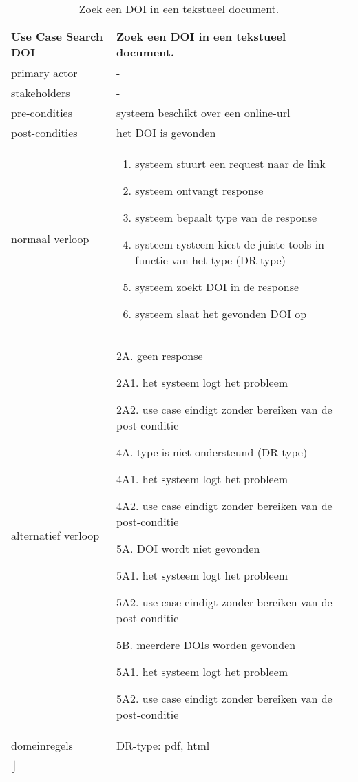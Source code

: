 \begin{table}[ptb]
    \centering
    \begin{tabular}{ | m{5cm} | m{10cm}| } 
        \hline
        \rowcolor{lightgray}
        Use Case Search DOI & Zoek een DOI in een tekstueel document. \\ 
        \hline
        primary actor & - \\ 
        \hline
        stakeholders & - \\ 
        \hline
        pre-condities & systeem beschikt over een online-url \\ 
        \hline
        post-condities & het DOI is gevonden \\ 
        \hline
        normaal verloop & 
        \begin{enumerate}
            \item systeem stuurt een request naar de link
            \item systeem ontvangt response
            \item systeem bepaalt type van de response
            \item systeem systeem kiest de juiste tools in functie van het type (DR-type)
            \item systeem zoekt DOI in de response
            \item systeem slaat het gevonden DOI op
        \end{enumerate} \\ 
        \hline
        alternatief verloop & 
        \begin{description}
            \item 2A. geen response
            \item 2A1. het systeem logt het probleem
            \item 2A2. use case eindigt zonder bereiken van de post-conditie
            \item 4A. type is niet ondersteund (DR-type)
            \item 4A1. het systeem logt het probleem
            \item 4A2. use case eindigt zonder bereiken van de post-conditie
            \item 5A. DOI wordt niet gevonden
            \item 5A1. het systeem logt het probleem
            \item 5A2. use case eindigt zonder bereiken van de post-conditie
            \item 5B. meerdere DOIs worden gevonden
            \item 5A1. het systeem logt het probleem
            \item 5A2. use case eindigt zonder bereiken van de post-conditie
        \end{description} \\ 
        \hline
        domeinregels & DR-type: pdf, html\\⌡ 
        \hline
    \end{tabular}
    \caption{Zoek een DOI in een tekstueel document.}
\end{table}
\newpage
